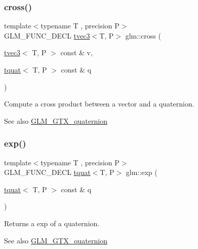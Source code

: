 \subsubsection{\texorpdfstring{cross()}{cross()}\hspace{0.1cm}{\footnotesize\ttfamily [2/2]}}
{\footnotesize\ttfamily template$<$typename T , precision P$>$ \\
G\+L\+M\+\_\+\+F\+U\+N\+C\+\_\+\+D\+E\+CL \hyperlink{structglm_1_1tvec3}{tvec3}$<$T, P$>$ glm\+::cross (\begin{DoxyParamCaption}\item[{\hyperlink{structglm_1_1tvec3}{tvec3}$<$ T, P $>$ const \&}]{v,  }\item[{\hyperlink{structglm_1_1tquat}{tquat}$<$ T, P $>$ const \&}]{q }\end{DoxyParamCaption})}

Compute a cross product between a vector and a quaternion.

\begin{DoxySeeAlso}{See also}
\hyperlink{group__gtx__quaternion}{G\+L\+M\+\_\+\+G\+T\+X\+\_\+quaternion} 
\end{DoxySeeAlso}
\mbox{\label{group__gtx__quaternion_ga17295173d4c2b5ae49b84e9993b63a62}} 
\subsubsection{\texorpdfstring{exp()}{exp()}}
{\footnotesize\ttfamily template$<$typename T , precision P$>$ \\
G\+L\+M\+\_\+\+F\+U\+N\+C\+\_\+\+D\+E\+CL \hyperlink{structglm_1_1tquat}{tquat}$<$T, P$>$ glm\+::exp (\begin{DoxyParamCaption}\item[{\hyperlink{structglm_1_1tquat}{tquat}$<$ T, P $>$ const \&}]{q }\end{DoxyParamCaption})}

Returns a exp of a quaternion.

\begin{DoxySeeAlso}{See also}
\hyperlink{group__gtx__quaternion}{G\+L\+M\+\_\+\+G\+T\+X\+\_\+quaternion} 
\end{DoxySeeAlso}
\mbox{\label{group__gtx__quaternion_ga90de879d97487ec804522dd418e5d8a0}} 
